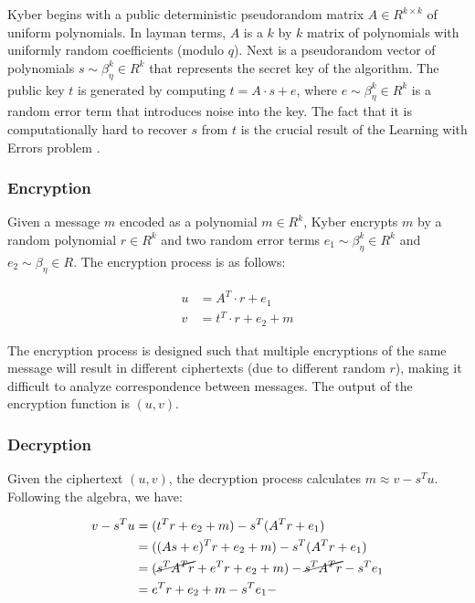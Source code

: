 Kyber begins with a public deterministic pseudorandom matrix $A \in R^{k \times k}$ of uniform polynomials. In layman terms, $A$ is a $k$ by $k$ matrix of polynomials with uniformly random coefficients (modulo $q$). Next is a pseudorandom vector of polynomials $s \sim \beta_\eta^k \in R^k$ that represents the secret key of the algorithm. The public key $t$ is generated by computing $t = A \cdot s + e$, where $e \sim \beta_\eta^k \in R^k$ is a random error term that introduces noise into the key. The fact that it is computationally hard to recover $s$ from $t$ is the crucial result of the Learning with Errors problem \cite{lwe}.

\subsubsection*{Encryption}

Given a message $m$ encoded as a polynomial $m \in R^k$, Kyber encrypts $m$ by a random polynomial $r \in R^k$ and two random error terms $e_1 \sim \beta_\eta^k \in R^k$ and $e_2 \sim \beta_\eta \in R$. The encryption process is as follows:

\begin{align*}
  u & = A^T \cdot r + e_1     \\
  v & = t^T \cdot r + e_2 + m
\end{align*}

The encryption process is designed such that multiple encryptions of the same message will result in different ciphertexts (due to different random $r$), making it difficult to analyze correspondence between messages. The output of the encryption function is $(u, v)$.

\subsubsection*{Decryption}

Given the ciphertext $(u, v)$, the decryption process calculates $m \approx v - s^Tu$. Following the algebra, we have:

\begin{align*}
  v - s^Tu & = (t^Tr + e_2 + m) - s^T (A^Tr + e_1)                              \\
           & = ((As + e)^Tr + e_2 + m) - s^T (A^Tr + e_1)                       \\
           & = (\cancel{s^TA^Tr} + e^Tr + e_2 + m) - \cancel{s^T A^Tr} - s^Te_1 \\
           & = e^Tr + e_2 + m - s^Te_1-
\end{align*}

